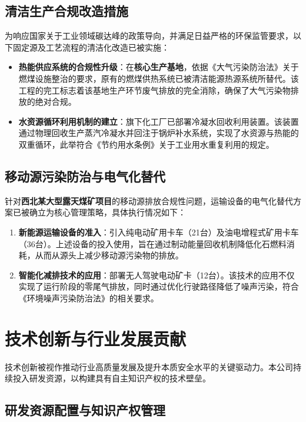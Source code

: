 \documentclass[a4paper,12pt]{article}
\begin{document}
\subsection{清洁生产合规改造措施}

为响应国家关于工业领域碳达峰的政策导向，并满足日益严格的环保监管要求，以下固定源及工艺流程的清洁化改造已被实施：

\begin{itemize}
    \item \textbf{热能供应系统的合规性升级}：在\textbf{核心生产基地}，依据《大气污染防治法》关于燃煤设施整治的要求，原有的燃煤供热系统已被清洁能源热源系统所替代。该工程的完工标志着该基地生产环节废气排放的完全消除，确保了大气污染物排放的绝对合规。
    \item \textbf{水资源循环利用机制的建立}：旗下化工厂已部署冷凝水回收利用装置。该装置通过物理回收生产蒸汽冷凝水并回注于锅炉补水系统，实现了水资源与热能的双重循环，此举符合《节约用水条例》关于工业用水重复利用的规定。
\end{itemize}

\subsection{移动源污染防治与电气化替代}

针对\textbf{西北某大型露天煤矿项目}的移动源排放合规性问题，运输设备的电气化替代方案已被确立为核心管理策略，具体执行情况如下：

\begin{enumerate}
    \item \textbf{新能源运输设备的准入}：引入纯电动矿用卡车（21台）及油电增程式矿用卡车（36台）。上述设备的投入使用，旨在通过制动能量回收机制降低化石燃料消耗，从而从源头上减少移动源污染物的排放。
    \item \textbf{智能化减排技术的应用}：部署无人驾驶电动矿卡（12台）。该技术的应用不仅实现了运行阶段的零尾气排放，同时通过优化行驶路径降低了噪声污染，符合《环境噪声污染防治法》的相关要求。
\end{enumerate}

\section{技术创新与行业发展贡献}

技术创新被视作推动行业高质量发展及提升本质安全水平的关键驱动力。本公司持续投入研发资源，以构建具有自主知识产权的技术壁垒。

\subsection{研发资源配置与知识产权管理}
\end{document}
